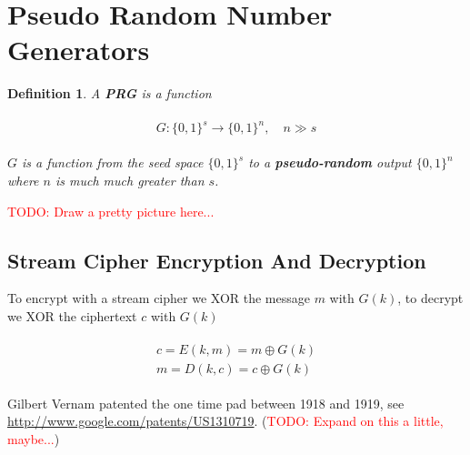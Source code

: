 \documentclass[11pt,a4paper]{report}
\newcommand\todo[1]{\noindent\textcolor{red}{TODO: #1}}
\newtheorem{definition}{Definition}
\begin{document}
\section{Pseudo Random Number Generators}
\begin{definition}
A \textbf{PRG} is a function

\begin{gather}
\begin{gathered}
	G : \{0,1\}^s \rightarrow \{0,1\}^n, \quad n \gg s
\end{gathered}
\end{gather}

\noindent
$G$ is a function from the seed space $\{0,1\}^s$ to a \textbf{pseudo-random} output $\{0,1\}^n$ where $n$ is much much greater than $s$.
\end{definition}

\todo{Draw a pretty picture here...} 


\subsection{Stream Cipher Encryption And Decryption}
\noindent
To encrypt with a stream cipher we XOR the message $m$ with $G(k)$, to decrypt we XOR the ciphertext $c$ with $G(k)$

\begin{gather}
\begin{gathered}
	c = E(k, m) = m \oplus G(k) \\
	m = D(k, c) = c \oplus G(k)
\end{gathered}
\end{gather}




\begin{thebibliography}{9} 
	 Gilbert Vernam patented the one time pad between 1918 and 1919, see \url{http://www.google.com/patents/US1310719}. (\todo{Expand on this a little, maybe...})
\end{thebibliography}
\end{document}
